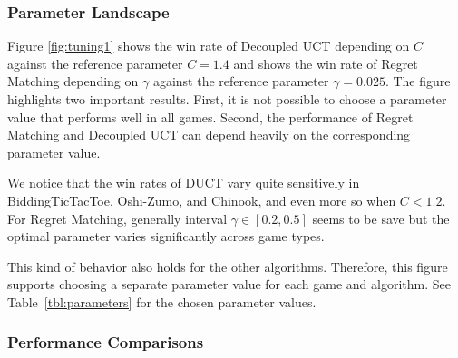 \documentclass[conference]{IEEEtran}
\begin{document}
\subsubsection{Parameter Landscape}

Figure \ref{fig:tuning1} shows the win rate of Decoupled UCT depending on $C$ against the reference parameter $C=1.4$ and 
shows the win rate of Regret Matching depending on $\gamma$ against the reference parameter $\gamma = 0.025$. The figure 
highlights two important results. First, it is not possible to choose a parameter value that performs well in all games. 
Second, the performance of Regret Matching and Decoupled UCT can depend heavily on the corresponding parameter value. 

We notice that the win rates of DUCT vary quite sensitively in BiddingTicTacToe, Oshi-Zumo, and Chinook, and even more so when $C < 1.2$. 
For Regret Matching, generally interval $\gamma \in [0.2,0.5]$ seems to be save but the optimal parameter varies significantly across game types.

This kind of behavior also holds for the other algorithms. Therefore, this figure supports choosing a separate parameter value 
for each game and algorithm. See Table~\ref{tbl:parameters} for the chosen parameter values.


\subsubsection{Performance Comparisons}
\end{document}
